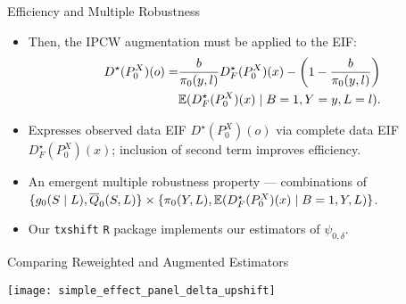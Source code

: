 \documentclass{beamer}
\begin{document}
\begin{frame}[c]{Efficiency and Multiple Robustness~\citep{hejazi2020efficient}}

\begin{center}
\begin{itemize}
  \itemsep8pt
  \item Then, the IPCW augmentation must be applied to the EIF\footnotemark:
    \begin{align*}
      D^{\star}(P_0^X)(o) = &\frac{b}{\pi_0(y, l)} D^{\star}_F(P_0^X)(x) -
        \left(1 - \frac{b}{\pi_0(y, l)}\right) \\
        &\mathbb{E}(D^{\star}_F(P_0^X)(x) \mid B = 1, Y = y, L = l).
    \end{align*}
  \item Expresses observed data EIF $D^{\star}(P_0^X)(o)$ via complete data
     EIF $D^{\star}_F(P_0^X)(x)$; inclusion of second term improves efficiency.
 \item An emergent multiple robustness property --- combinations of
    $\{g_0(S \mid L), \overline{Q}_0(S,L)\} \times \{\pi_0(Y, L),
    \mathbb{E}(D^{\star}_F(P^X_0)(x) \mid B = 1, Y, L)\}$.
  \item Our \texttt{txshift} \texttt{R} package implements our estimators of
    $\psi_{0,\delta}$.
\end{itemize}
\end{center}



\end{frame}



\begin{frame}[c]{Comparing Reweighted and Augmented Estimators}

\hspace*{-0.75cm}\texttt{[image: simple\_effect\_panel\_delta\_upshift]}

\note{
}

\end{frame}
\end{document}
